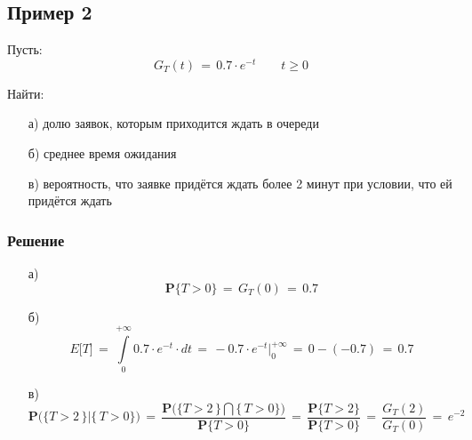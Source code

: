 \documentclass{article}
\begin{document}
\subsection*{Пример 2}
Пусть:
\[ G_T(t) \, = \, 0.7 \! \cdot \! e^{-t} \qquad t \! \geqslant \! 0 \]\par
Найти:
\begin{enumerate}
\item[а)] долю заявок, которым приходится ждать в очереди
\item[б)] среднее время ожидания
\item[в)] вероятность, что заявке придётся ждать более 2 минут при условии, что ей придётся ждать
\end{enumerate}
\subsubsection*{Решение}
\begin{enumerate}
\item[а)]
\[ \mathbf{P} \big\{ T \! > \! 0 \big\} \, = \, G_T(0) \, = \, 0.7 \]
\item[б)]
\[ E \big[ T \big] \, = \, \int\limits_0^{+\infty} 0.7 \! \cdot \! e^{-t} \! \cdot \! dt \, = \, -0.7 \! \cdot \! e^{-t} \Big|_0^{+\infty} \, = \, 0 \! - \! (-0.7) \, = \, 0.7 \]
\item[в)]
\[ \mathbf{P} \bigg( \big\{ T \! > \! 2 \, \big\} \Big| \big\{ \, T \! > \! 0 \big\} \bigg) \, = \, \dfrac{\mathbf{P} \bigg( \big\{ T \! > \! 2 \, \big\} \bigcap \big\{ \, T \! > \! 0 \big\} \bigg)}{\mathbf{P} \big\{ T \! > \! 0 \big\}} \, = \, \dfrac{\mathbf{P} \big\{ T \! > \! 2 \big\}}{\mathbf{P} \big\{ T \! > \! 0 \big\}} \, = \, \dfrac{G_T(2)}{G_T(0)} \, = \, e^{-2} \]
\end{enumerate}
\end{document}
